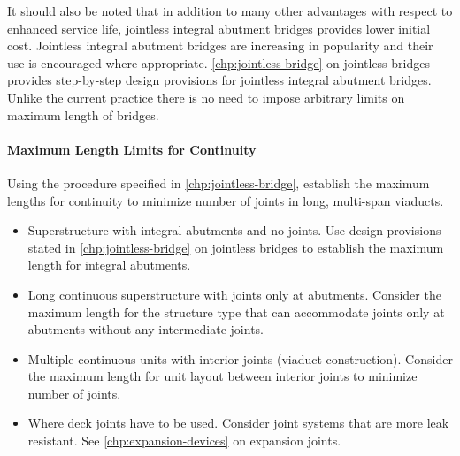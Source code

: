It should also be noted that in addition to many other advantages with respect to enhanced service life, jointless
integral abutment bridges provides lower initial cost. Jointless integral abutment bridges are increasing in popularity
and their use is encouraged where appropriate. \cref{chp:jointless-bridge} on jointless bridges provides step-by-step design provisions
for jointless integral abutment bridges. Unlike the current practice there is no need to impose arbitrary limits on
maximum length of bridges.

\paragraph{Maximum Length Limits for Continuity}
Using the procedure specified in \cref{chp:jointless-bridge}, establish the maximum lengths for continuity to minimize number of
joints in long, multi-span viaducts.
\begin{itemize}
  \item Superstructure with integral abutments and no joints. Use design provisions stated in \cref{chp:jointless-bridge} on jointless bridges to establish the maximum length for integral abutments.
  \item  Long continuous superstructure with joints only at abutments. Consider the maximum length for the structure type that can accommodate joints only at abutments without any intermediate joints.
  \item Multiple continuous units with interior joints (viaduct construction). Consider the maximum length for unit layout between interior joints to minimize number of joints.
  \item Where deck joints have to be used. Consider joint systems that are more leak resistant. See \cref{chp:expansion-devices} on expansion joints.
\end{itemize}


